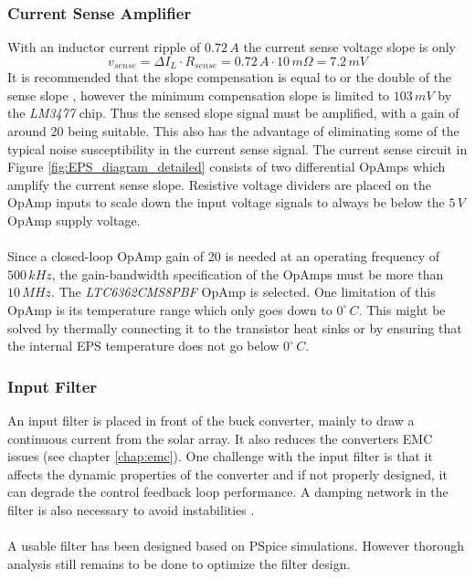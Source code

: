 \subsubsection*{Current Sense Amplifier}
With an inductor current ripple of $0.72\,A$ the current sense voltage slope is only 
%
\begin{equation}
v_{sense}=\Delta I_L\cdot R_{sense}=0.72\,A\cdot 10\,m\Omega = 7.2\,mV
\end{equation}
%
It is recommended that the slope compensation is equal to or the double of the sense slope \cite[sec. 12-1]{Fundamentals}, however the minimum compensation slope is limited to $103\,mV$ by the \textit{LM3477} chip. Thus the sensed slope signal must be amplified, with a gain of around 20 being suitable. This also has the advantage of eliminating some of the typical noise susceptibility in the current sense signal. The current sense circuit in Figure \ref{fig:EPS_diagram_detailed} consists of two differential OpAmps which amplify the current sense slope. Resistive voltage dividers are placed on the OpAmp inputs to scale down the input voltage signals to always be below the $5\,V$ OpAmp supply voltage.
\\
\\
Since a closed-loop OpAmp gain of 20 is needed at an operating frequency of $500\,kHz$, the gain-bandwidth specification of the OpAmps must be more than $10\,MHz$. The \textit{LTC6362CMS8PBF} OpAmp is selected. One limitation of this OpAmp is its temperature range which only goes down to $0^{\circ}\,C$. This might be solved by thermally connecting it to the transistor heat sinks or by ensuring that the internal \ac{EPS} temperature does not go below $0^{\circ}\,C$.
%
\subsubsection*{Input Filter}
An input filter is placed in front of the buck converter, mainly to draw a continuous current from the solar array. It also reduces the converters \ac{EMC} issues (see chapter \ref{chap:emc}). One challenge with the input filter is that it affects the dynamic properties of the converter and if not properly designed, it can degrade the control feedback loop performance. A damping network in the filter is also necessary to avoid instabilities \cite[sec. 10-3]{Fundamentals}.
\\
\\
A usable filter has been designed based on PSpice simulations. However thorough analysis still remains to be done to optimize the filter design.
%
%

